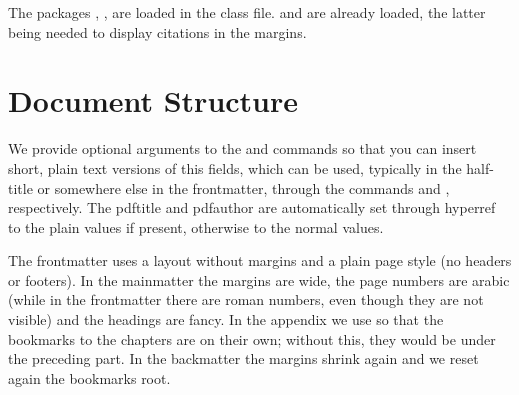 
The packages , ,  
are loaded in the class file.  and  are 
already loaded, the latter being needed to display citations in the 
margins.

\section{Document Structure}

We provide optional arguments to the  and 
 commands so that you can insert short, plain text 
versions of this fields, which can be used, typically in the half-title 
or somewhere else in the frontmatter, through the commands 
 and , respectively. The 
pdftitle and pdfauthor are automatically set through hyperref to the 
plain values if present, otherwise to the normal values.

The frontmatter uses a layout without margins and a plain page style 
(\ie no headers or footers). In the mainmatter the margins are wide, the 
page numbers are arabic (while in the frontmatter there are roman 
numbers, even though they are not visible) and the headings are fancy. 
In the appendix we use  so that 
the bookmarks to the chapters are on their own; without this, they would 
be under the preceding part. In the backmatter the margins shrink again 
and we reset again the bookmarks root.
